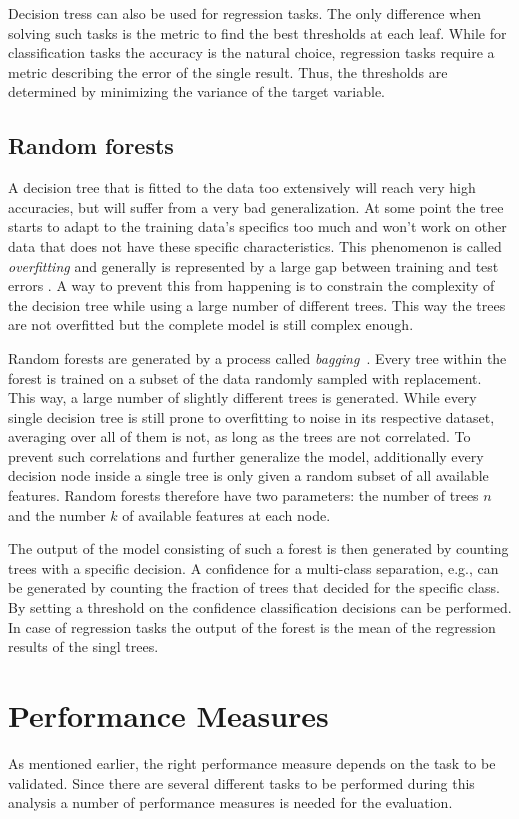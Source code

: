 Decision tress can also be used for regression tasks. The only difference when
solving such tasks is the metric to find the best thresholds at each leaf.
While for classification tasks the accuracy is the natural choice, regression
tasks require a metric describing the error of the single result. Thus, the
thresholds are determined by minimizing the variance of the target variable.

\subsection{Random forests}
%
A decision tree that is fitted to the data too extensively will reach
very high accuracies, but will suffer from a very bad generalization. At some
point the tree starts to adapt to the training data's specifics too much and
won't work on other data that does not have these specific characteristics.
This phenomenon is called \textit{overfitting} and generally is represented by
a large gap between training and test errors \cite{goodfellow}. A way to
prevent this from happening is to constrain the complexity of the decision tree
while using a large number of different trees. This way the trees are not
overfitted but the complete model is still complex enough.

Random forests are generated by a process called
\textit{bagging}~\cite{bagging}. Every tree within the forest is trained on a
subset of the data randomly sampled with replacement. This way, a large number
of slightly different trees is generated. While every single decision tree is
still prone to overfitting to noise in its respective dataset, averaging over
all of them is not, as long as the trees are not correlated. To prevent such
correlations and further generalize the model, additionally every decision node
inside a single tree is only given a random subset of all available features.
Random forests therefore have two parameters: the number of trees $n$ and the
number $k$ of available features at each node.

The output of the model consisting of such a forest is then generated
by counting trees with a specific decision. A confidence for a multi-class
separation, e.g., can be generated by counting the fraction of trees that
decided for the specific class. By setting a threshold on the confidence
classification decisions can be performed. In case of regression tasks the
output of the forest is the mean of the regression results of the singl trees.

\section{Performance Measures}
%
As mentioned earlier, the right performance measure depends on the task to be
validated. Since there are several different tasks to be performed during this
analysis a number of performance measures is needed for the evaluation.


